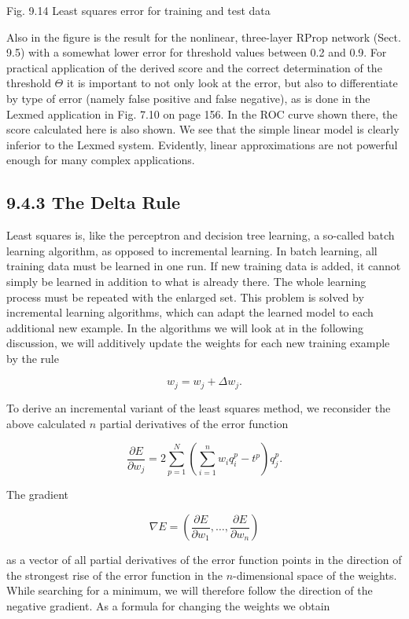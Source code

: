 \documentclass[10pt]{article}
\begin{document}
Fig. 9.14 Least squares error for training and test data


Also in the figure is the result for the nonlinear, three-layer RProp network (Sect. 9.5) with a somewhat lower error for threshold values between 0.2 and 0.9. For practical application of the derived score and the correct determination of the threshold $\Theta$ it is important to not only look at the error, but also to differentiate by type of error (namely false positive and false negative), as is done in the Lexmed application in Fig. 7.10 on page 156. In the ROC curve shown there, the score calculated here is also shown. We see that the simple linear model is clearly inferior to the Lexmed system. Evidently, linear approximations are not powerful enough for many complex applications.

\subsection*{9.4.3 The Delta Rule}
Least squares is, like the perceptron and decision tree learning, a so-called batch learning algorithm, as opposed to incremental learning. In batch learning, all training data must be learned in one run. If new training data is added, it cannot simply be learned in addition to what is already there. The whole learning process must be repeated with the enlarged set. This problem is solved by incremental learning algorithms, which can adapt the learned model to each additional new example. In the algorithms we will look at in the following discussion, we will additively update the weights for each new training example by the rule

$$
w_{j}=w_{j}+\Delta w_{j} .
$$

To derive an incremental variant of the least squares method, we reconsider the above calculated $n$ partial derivatives of the error function

$$
\frac{\partial E}{\partial w_{j}}=2 \sum_{p=1}^{N}\left(\sum_{i=1}^{n} w_{i} q_{i}^{p}-t^{p}\right) q_{j}^{p} .
$$

The gradient

$$
\nabla E=\left(\frac{\partial E}{\partial w_{1}}, \ldots, \frac{\partial E}{\partial w_{n}}\right)
$$

as a vector of all partial derivatives of the error function points in the direction of the strongest rise of the error function in the $n$-dimensional space of the weights. While searching for a minimum, we will therefore follow the direction of the negative gradient. As a formula for changing the weights we obtain
\end{document}
